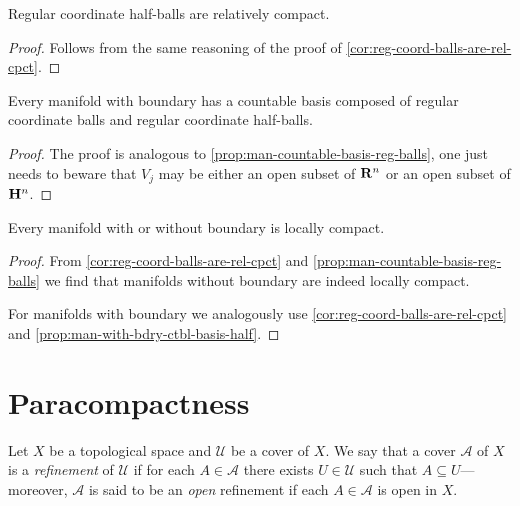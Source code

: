 \begin{corollary}
    \label{cor:reg-coord-half-balls-are-rel-cpct}
    Regular coordinate half-balls are relatively compact.
\end{corollary}

\begin{proof}
    Follows from the same reasoning of the proof of
    \cref{cor:reg-coord-balls-are-rel-cpct}.
\end{proof}

\begin{proposition}
    \label{prop:man-with-bdry-ctbl-basis-half}
    Every manifold with boundary has a countable basis composed of regular
    coordinate balls and regular coordinate half-balls.
\end{proposition}

\begin{proof}
    The proof is analogous to \cref{prop:man-countable-basis-reg-balls}, one just
    needs to beware that \(V_j\) may be either an open subset of \(\mathbf{R}^n\) or an open
    subset of \(\mathbf{H}^n\).
\end{proof}

\begin{proposition}
    \label{prop:manifold-locally-compact}
    Every manifold with or without boundary is locally compact.
\end{proposition}

\begin{proof}
    From \cref{cor:reg-coord-balls-are-rel-cpct} and
    \cref{prop:man-countable-basis-reg-balls} we find that manifolds without
    boundary are indeed locally compact.

    For manifolds with boundary we analogously use
    \cref{cor:reg-coord-balls-are-rel-cpct} and
    \cref{prop:man-with-bdry-ctbl-basis-half}.
\end{proof}


\section{Paracompactness}

\begin{definition}
    \label{def:cover-refinement}
    Let \(X\) be a topological space and \(\mathcal{U}\) be a cover of
    \(X\). We say that a cover \(\mathcal{A}\) of \(X\) is a \emph{refinement} of
    \(\mathcal{U}\) if for each \(A \in \mathcal{A}\) there exists
    \(U \in \mathcal{U}\) such that \(A \subseteq U\)---moreover, \(\mathcal{A}\)
    is said to be an \emph{open} refinement if each \(A \in \mathcal{A}\) is open in
    \(X\).
\end{definition}

